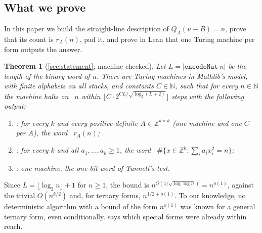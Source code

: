 \documentclass[10pt]{amsart}
\theoremstyle{plain}
\newtheorem{theorem}{Theorem}[section]
\theoremstyle{definition}
\theoremstyle{remark}
\numberwithin{equation}{section}
\newcommand{\Z}{\mathbb{Z}}
\newcommand{\N}{\mathbb{N}}
\begin{document}
\subsection{What we prove}
In this paper we build the straight-line description of $Q_A(u-B)=n$, prove that its count is $r_A(n)$, pad
it, and prove in Lean that one Turing machine per form outputs the answer.

\begin{theorem}[\cref{sec:statement}; machine-checked]\label{thm:main}
Let $L=|\mathtt{encodeNat}\ n|$ be the length of the binary word of $n$. There are Turing machines in
Mathlib's  model, with finite alphabets on all stacks, and constants $C\in\N$, such that for every
$n\in\N$ the machine halts on ~$n$ within $\lfloor C\cdot2^{CL/\sqrt{\log_2(L+2)}}\rfloor$
steps with the following output:
\begin{enumerate}[label=(\roman*)]
\item {}: for every $k$ and every positive-definite $A\in\Z^{k\times k}$ (one machine
and one $C$ per $A$), the word ~$r_A(n)$;
\item {}: for every $k$ and all $a_1,\dots,a_k\ge1$, the word
~$\#\{x\in\Z^k:\sum_ia_ix_i^2=n\}$;
\item {}: one machine, the one-bit word of Tunnell's test.
\end{enumerate}
\end{theorem}

\noindent Since $L=\lfloor\log_2n\rfloor+1$ for $n\ge1$, the bound is $n^{O(1/\sqrt{\log\log n})}=n^{o(1)}$,
against the trivial $O(n^{k/2})$ and, for ternary forms, $n^{1/2+o(1)}$. To our knowledge, no deterministic
algorithm with a bound of the form $n^{o(1)}$ was known for a general ternary form, even conditionally.
 says which special forms were already within reach.
\end{document}
